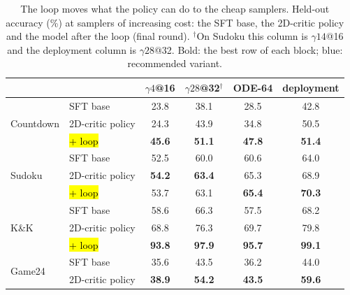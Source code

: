 \begin{table}[H]\centering\small
\caption{The loop moves what the policy can do to the cheap samplers. Held-out accuracy (\%) at samplers of increasing cost: the SFT base, the 2D-critic policy and the model after the loop (final round). $^\dagger$On Sudoku this column is $\gamma14$@16 and the deployment column is $\gamma28$@32. Bold: the best row of each block; blue: recommended variant.}\label{tab:samplers}
\begin{tabular}{@{}llcccc@{}}\toprule
 & & $\gamma4$@16 & $\gamma28$@32$^\dagger$ & ODE-64 & deployment\\\midrule
\multirow{3}{*}{Countdown} & SFT base & 23.8 & 38.1 & 28.5 & 42.8\\
 & 2D-critic policy & 24.3 & 43.9 & 34.8 & 50.5\\
 & \hl{+ loop} & \textbf{45.6} & \textbf{51.1} & \textbf{47.8} & \textbf{51.4}\\\midrule
\multirow{3}{*}{Sudoku} & SFT base & 52.5 & 60.0 & 60.6 & 64.0\\
 & 2D-critic policy & \textbf{54.2} & \textbf{63.4} & 65.3 & 68.9\\
 & \hl{+ loop} & 53.7 & 63.1 & \textbf{65.4} & \textbf{70.3}\\\midrule
\multirow{3}{*}{K\&K} & SFT base & 58.6 & 66.3 & 57.5 & 68.2\\
 & 2D-critic policy & 68.8 & 76.3 & 69.7 & 79.8\\
 & \hl{+ loop} & \textbf{93.8} & \textbf{97.9} & \textbf{95.7} & \textbf{99.1}\\\midrule
\multirow{2}{*}{Game24} & SFT base & 35.6 & 43.5 & 36.2 & 44.0\\
 & 2D-critic policy & \textbf{38.9} & \textbf{54.2} & \textbf{43.5} & \textbf{59.6}\\
\bottomrule\end{tabular}\end{table}

\fi


\iffalse
